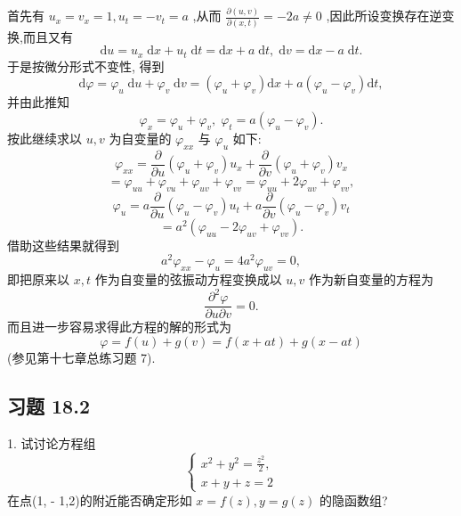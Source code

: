 \begin{solution}

\end{solution}
首先有 \({u}_{x} = {v}_{x} = 1,{u}_{t} =  - {v}_{t} = a\) ,从而 \(\frac{\partial \left( {u,v}\right) }{\partial \left( {x,t}\right) } =  - {2a} \neq  0\) ,因此所设变换存在逆变换,而且又有
\[
\mathrm{d}u = {u}_{x}\mathrm{\;d}x + {u}_{t}\mathrm{\;d}t = \mathrm{d}x + a\mathrm{\;d}t,\mathrm{\;d}v = \mathrm{d}x - a\mathrm{\;d}t.
\]
于是按微分形式不变性, 得到
\[
\mathrm{d}\varphi  = {\varphi }_{u}\mathrm{\;d}u + {\varphi }_{v}\mathrm{\;d}v = \left( {{\varphi }_{u} + {\varphi }_{v}}\right) \mathrm{d}x + a\left( {{\varphi }_{u} - {\varphi }_{v}}\right) \mathrm{d}t,
\]
并由此推知
\[
{\varphi }_{x} = {\varphi }_{u} + {\varphi }_{v},\;{\varphi }_{t} = a\left( {{\varphi }_{u} - {\varphi }_{v}}\right) .
\]
按此继续求以 \(u,v\) 为自变量的 \({\varphi }_{xx}\) 与 \({\varphi }_{u}\) 如下:
\[
{\varphi }_{xx} = \frac{\partial }{\partial u}\left( {{\varphi }_{u} + {\varphi }_{v}}\right) {u}_{x} + \frac{\partial }{\partial v}\left( {{\varphi }_{u} + {\varphi }_{v}}\right) {v}_{x}
\]
\[
= {\varphi }_{uu} + {\varphi }_{vu} + {\varphi }_{uv} + {\varphi }_{vv} = {\varphi }_{uu} + 2{\varphi }_{uv} + {\varphi }_{vv},
\]
\[
{\varphi }_{u} = a\frac{\partial }{\partial u}\left( {{\varphi }_{u} - {\varphi }_{v}}\right) {u}_{t} + a\frac{\partial }{\partial v}\left( {{\varphi }_{u} - {\varphi }_{v}}\right) {v}_{t}
\]
\[
= {a}^{2}\left( {{\varphi }_{uu} - 2{\varphi }_{uv} + {\varphi }_{vv}}\right) .
\]
借助这些结果就得到
\[
{a}^{2}{\varphi }_{xx} - {\varphi }_{u} = 4{a}^{2}{\varphi }_{uv} = 0,
\]
即把原来以 \(x,t\) 作为自变量的弦振动方程变换成以 \(u,v\) 作为新自变量的方程为
\[
\frac{{\partial }^{2}\varphi }{\partial u\partial v} = 0.
\]
而且进一步容易求得此方程的解的形式为
\[
\varphi  = f\left( u\right)  + g\left( v\right)  = f\left( {x + {at}}\right)  + g\left( {x - {at}}\right)
\]
(参见第十七章总练习题 7).

\subsection{习题 18.2}

1. 试讨论方程组
\[
\left\{  \begin{array}{l} {x}^{2} + {y}^{2} = \frac{{z}^{2}}{2}, \\  x + y + z = 2 \end{array}\right.
\]
在点(1, - 1,2)的附近能否确定形如 \(x = f\left( z\right) ,y = g\left( z\right)\) 的隐函数组?

